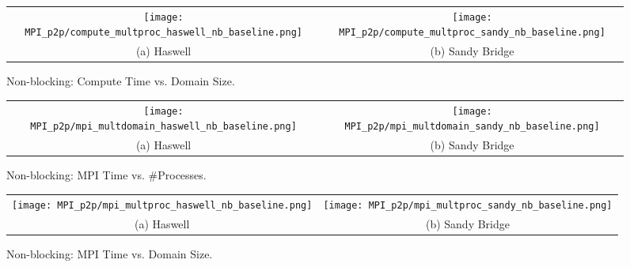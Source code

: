 \begin{enumerate}
	\begin{figure}[p] %
		\begin{tabular}{cc}
			\hspace*{-0.35\linewidth}\texttt{[image: MPI\_p2p/compute\_multproc\_haswell\_nb\_baseline.png]} & \hspace*{-0.05\linewidth}\texttt{[image: MPI\_p2p/compute\_multproc\_sandy\_nb\_baseline.png]} \\
			\hspace*{-0.45\linewidth}(a) Haswell & \hspace*{-0.15\linewidth}(b) Sandy Bridge\\[6pt]
		\end{tabular}
		\caption{Non-blocking: Compute Time vs. Domain Size.}
		\label{fig:compute_multproc_nb_baseline}
	\end{figure}
	
	\begin{figure}[p] %
		\begin{tabular}{cc}
			\hspace*{-0.35\linewidth}\texttt{[image: MPI\_p2p/mpi\_multdomain\_haswell\_nb\_baseline.png]} & \hspace*{-0.05\linewidth}\texttt{[image: MPI\_p2p/mpi\_multdomain\_sandy\_nb\_baseline.png]} \\
			\hspace*{-0.45\linewidth}(a) Haswell & \hspace*{-0.15\linewidth}(b) Sandy Bridge\\[6pt]
		\end{tabular}
		\caption{Non-blocking: MPI Time vs. \#Processes.}
		\label{fig:mpi_multdomain_nb_baseline}
	\end{figure}
	
	\begin{figure}[p] %
		\begin{tabular}{cc}
			\hspace*{-0.35\linewidth}\texttt{[image: MPI\_p2p/mpi\_multproc\_haswell\_nb\_baseline.png]} & \hspace*{-0.05\linewidth}\texttt{[image: MPI\_p2p/mpi\_multproc\_sandy\_nb\_baseline.png]} \\
			\hspace*{-0.45\linewidth}(a) Haswell & \hspace*{-0.15\linewidth}(b) Sandy Bridge\\[6pt]
		\end{tabular}
		\caption{Non-blocking: MPI Time vs. Domain Size.}
		\label{fig:mpi_multproc_nb_baseline}
	\end{figure}
	

\end{enumerate}
